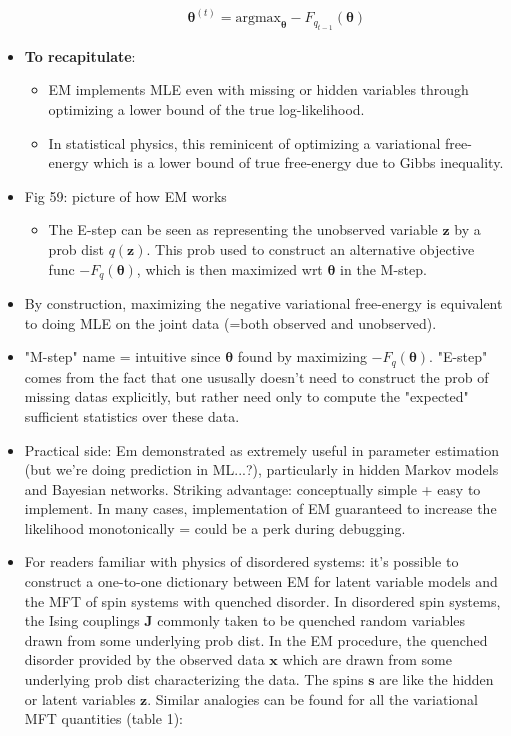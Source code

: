 \documentclass[norsk,a4paper,11pt]{article}
\begin{document}
\begin{itemize}
\begin{enumerate}
\begin{align}
			\bm{\theta}^{(t)} = \text{argmax}_{\bm{\theta}} - F_{q_{t-1}} (\bm{\theta}) 
		\end{align}
	\end{enumerate} 
	\item \textbf{To recapitulate}: 
	\begin{itemize}
		\item EM implements MLE even with missing or hidden variables through optimizing a lower bound of the true log-likelihood. 
		\item In statistical physics, this reminicent of optimizing a variational free-energy which is a lower bound of true free-energy due to Gibbs inequality. 
	\end{itemize}
	\item Fig 59: picture of how EM works
	\begin{itemize}
		\item The E-step can be seen as representing the unobserved variable $\bm{z}$ by a prob dist $q(\bm{z})$. This prob used to construct an alternative objective func $-F_q(\bm{\theta})$, which is then maximized wrt $\bm{\theta}$ in the M-step.
	\end{itemize}
	\item By construction, maximizing the negative variational free-energy is equivalent to doing MLE on the joint data (=both observed and unobserved). 
	\item "M-step" name = intuitive since $\bm{\theta}$ found by maximizing $-F_q(\bm{\theta})$. "E-step" comes from the fact that one ususally doesn't need to construct the prob of missing datas explicitly, but rather need only to compute the "expected" sufficient statistics over these data.
	\item Practical side: Em demonstrated as extremely useful in parameter estimation (but we're doing prediction in ML...?), particularly in hidden Markov models and Bayesian networks. Striking advantage: conceptually simple + easy to implement. In many cases, implementation of EM guaranteed to increase the likelihood monotonically = could be a perk during debugging.
	\item For readers familiar with physics of disordered systems: it's possible to construct a one-to-one dictionary between EM for latent variable models and the MFT of spin systems with quenched disorder. In disordered spin systems, the Ising couplings $\bm{J}$ commonly taken to be quenched random variables drawn from some underlying prob dist. In the EM procedure, the quenched disorder provided by the observed data $\bm{x}$ which are drawn from some underlying prob dist characterizing the data. The spins $\bm{s}$ are like the hidden or latent variables $\bm{z}$. Similar analogies can be found for all the variational MFT quantities (table 1):

\end{itemize}
\end{document}
